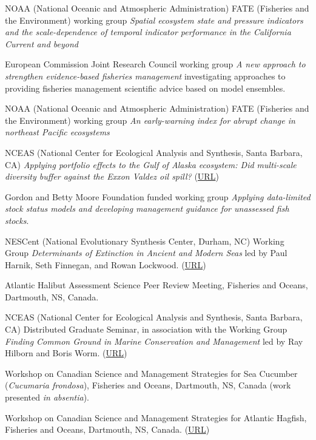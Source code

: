 \begin{description}
\tightlist
\item[2019]
NOAA (National Oceanic and Atmospheric Administration) FATE (Fisheries
and the Environment) working group \emph{Spatial ecosystem state and
pressure indicators and the scale-dependence of temporal indicator
performance in the California Current and beyond}
\item[2018--19]
European Commission Joint Research Council working group \emph{A new
approach to strengthen evidence-based fisheries management}
investigating approaches to providing fisheries management scientific
advice based on model ensembles.
\item[2016--17]
NOAA (National Oceanic and Atmospheric Administration) FATE (Fisheries
and the Environment) working group \emph{An early-warning index for
abrupt change in northeast Pacific ecosystems}
\item[2015--16]
NCEAS (National Center for Ecological Analysis and Synthesis, Santa
Barbara, CA) \emph{Applying portfolio effects to the Gulf of Alaska
ecosystem: Did multi-scale diversity buffer against the Exxon Valdez oil
spill?} (\href{https://www.nceas.ucsb.edu/featured/marshall}{URL})
\item[2015--16]
Gordon and Betty Moore Foundation funded working group \emph{Applying
data-limited stock status models and developing management guidance for
unassessed fish stocks}.
\item[2011--13]
NESCent (National Evolutionary Synthesis Center, Durham, NC) Working
Group \emph{Determinants of Extinction in Ancient and Modern Seas} led
by Paul Harnik, Seth Finnegan, and Rowan Lockwood.
(\href{http://www.nescent.org/science/awards_summary.php?id=256}{URL})
\item[2010]
Atlantic Halibut Assessment Science Peer Review Meeting, Fisheries and
Oceans, Dartmouth, NS, Canada.
\item[2007--09]
NCEAS (National Center for Ecological Analysis and Synthesis, Santa
Barbara, CA) Distributed Graduate Seminar, in association with the
Working Group \emph{Finding Common Ground in Marine Conservation and
Management} led by Ray Hilborn and Boris Worm.
(\href{http://www.nceas.ucsb.edu/projects/12307}{URL})
\item[2008]
Workshop on Canadian Science and Management Strategies for Sea Cucumber
(\emph{Cucumaria frondosa}), Fisheries and Oceans, Dartmouth, NS, Canada
(work presented \emph{in absentia}).
\item[2007]
Workshop on Canadian Science and Management Strategies for Atlantic
Hagfish, Fisheries and Oceans, Dartmouth, NS, Canada.
(\href{http://www.dfo-mpo.gc.ca/CSAS/Csas/Publications/Pro-CR/2009/2009_009_e.htm}{URL})
\end{description}

